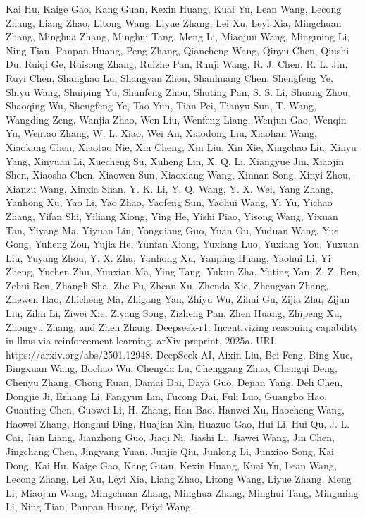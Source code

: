 Kai Hu, Kaige Gao, Kang Guan, Kexin Huang, Kuai Yu, Lean Wang, Lecong Zhang, Liang Zhao,
Litong Wang, Liyue Zhang, Lei Xu, Leyi Xia, Mingchuan Zhang, Minghua Zhang, Minghui Tang,
Meng Li, Miaojun Wang, Mingming Li, Ning Tian, Panpan Huang, Peng Zhang, Qiancheng Wang,
Qinyu Chen, Qiushi Du, Ruiqi Ge, Ruisong Zhang, Ruizhe Pan, Runji Wang, R. J. Chen, R. L.
Jin, Ruyi Chen, Shanghao Lu, Shangyan Zhou, Shanhuang Chen, Shengfeng Ye, Shiyu Wang,
Shuiping Yu, Shunfeng Zhou, Shuting Pan, S. S. Li, Shuang Zhou, Shaoqing Wu, Shengfeng
Ye, Tao Yun, Tian Pei, Tianyu Sun, T. Wang, Wangding Zeng, Wanjia Zhao, Wen Liu, Wenfeng
Liang, Wenjun Gao, Wenqin Yu, Wentao Zhang, W. L. Xiao, Wei An, Xiaodong Liu, Xiaohan
Wang, Xiaokang Chen, Xiaotao Nie, Xin Cheng, Xin Liu, Xin Xie, Xingchao Liu, Xinyu Yang,
Xinyuan Li, Xuecheng Su, Xuheng Lin, X. Q. Li, Xiangyue Jin, Xiaojin Shen, Xiaosha Chen,
Xiaowen Sun, Xiaoxiang Wang, Xinnan Song, Xinyi Zhou, Xianzu Wang, Xinxia Shan, Y. K. Li,
Y. Q. Wang, Y. X. Wei, Yang Zhang, Yanhong Xu, Yao Li, Yao Zhao, Yaofeng Sun, Yaohui Wang,
Yi Yu, Yichao Zhang, Yifan Shi, Yiliang Xiong, Ying He, Yishi Piao, Yisong Wang, Yixuan Tan,
Yiyang Ma, Yiyuan Liu, Yongqiang Guo, Yuan Ou, Yuduan Wang, Yue Gong, Yuheng Zou, Yujia
He, Yunfan Xiong, Yuxiang Luo, Yuxiang You, Yuxuan Liu, Yuyang Zhou, Y. X. Zhu, Yanhong
Xu, Yanping Huang, Yaohui Li, Yi Zheng, Yuchen Zhu, Yunxian Ma, Ying Tang, Yukun Zha,
Yuting Yan, Z. Z. Ren, Zehui Ren, Zhangli Sha, Zhe Fu, Zhean Xu, Zhenda Xie, Zhengyan Zhang,
Zhewen Hao, Zhicheng Ma, Zhigang Yan, Zhiyu Wu, Zihui Gu, Zijia Zhu, Zijun Liu, Zilin Li,
Ziwei Xie, Ziyang Song, Zizheng Pan, Zhen Huang, Zhipeng Xu, Zhongyu Zhang, and Zhen
Zhang. Deepseek-r1: Incentivizing reasoning capability in llms via reinforcement learning. arXiv
preprint, 2025a. URL https://arxiv.org/abs/2501.12948.
DeepSeek-AI, Aixin Liu, Bei Feng, Bing Xue, Bingxuan Wang, Bochao Wu, Chengda Lu, Chenggang
Zhao, Chengqi Deng, Chenyu Zhang, Chong Ruan, Damai Dai, Daya Guo, Dejian Yang, Deli
Chen, Dongjie Ji, Erhang Li, Fangyun Lin, Fucong Dai, Fuli Luo, Guangbo Hao, Guanting Chen,
Guowei Li, H. Zhang, Han Bao, Hanwei Xu, Haocheng Wang, Haowei Zhang, Honghui Ding,
Huajian Xin, Huazuo Gao, Hui Li, Hui Qu, J. L. Cai, Jian Liang, Jianzhong Guo, Jiaqi Ni, Jiashi
Li, Jiawei Wang, Jin Chen, Jingchang Chen, Jingyang Yuan, Junjie Qiu, Junlong Li, Junxiao Song,
Kai Dong, Kai Hu, Kaige Gao, Kang Guan, Kexin Huang, Kuai Yu, Lean Wang, Lecong Zhang,
Lei Xu, Leyi Xia, Liang Zhao, Litong Wang, Liyue Zhang, Meng Li, Miaojun Wang, Mingchuan
Zhang, Minghua Zhang, Minghui Tang, Mingming Li, Ning Tian, Panpan Huang, Peiyi Wang,
